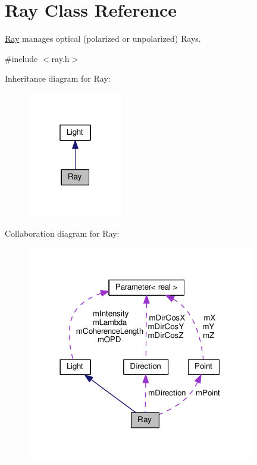 \hypertarget{classRay}{}\section{Ray Class Reference}
\label{classRay}


\hyperlink{classRay}{Ray} manages optical (polarized or unpolarized) Rays.  




{\ttfamily \#include $<$ray.\+h$>$}



Inheritance diagram for Ray\+:\nopagebreak
\begin{figure}[H]
\begin{center}
\leavevmode
\includegraphics[width=118pt]{classRay__inherit__graph}
\end{center}
\end{figure}


Collaboration diagram for Ray\+:
\nopagebreak
\begin{figure}[H]
\begin{center}
\leavevmode
\includegraphics[width=282pt]{classRay__coll__graph}
\end{center}
\end{figure}
